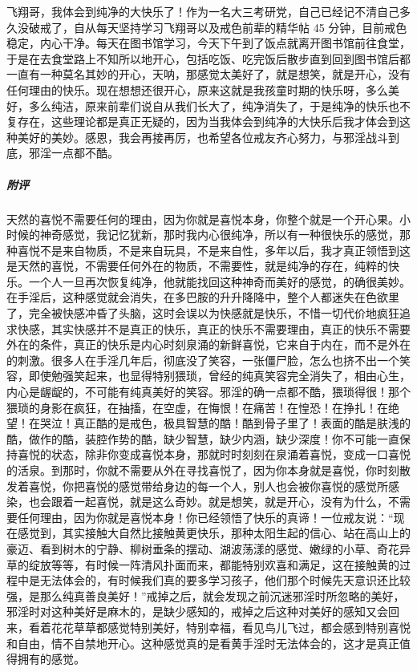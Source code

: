 \begin{case}
    飞翔哥，我体会到纯净的大快乐了！作为一名大三考研党，自己已经记不清自己多久没破戒了，自从每天坚持学习飞翔哥以及戒色前辈的精华帖 45 分钟，目前戒色稳定，内心干净。每天在图书馆学习，今天下午到了饭点就离开图书馆前往食堂，于是在去食堂路上不知所以地开心，包括吃饭、吃完饭后散步直到回到图书馆后都一直有一种莫名其妙的开心，天呐，那感觉太美好了，就是想笑，就是开心，没有任何理由的快乐。现在想想还很开心，原来这就是我孩童时期的快乐呀，多么美好，多么纯洁，原来前辈们说自从我们长大了，纯净消失了，于是纯净的快乐也不复存在，这些理论都是真正无疑的，因为当我体会到纯净的大快乐后我才体会到这种美好的美妙。感恩，我会再接再厉，也希望各位戒友齐心努力，与邪淫战斗到底，邪淫一点都不酷。
    \subparagraph{附评} 天然的喜悦不需要任何的理由，因为你就是喜悦本身，你整个就是一个开心果。小时候的神奇感觉，我记忆犹新，那时我内心很纯净，所以有一种很快乐的感觉，那种喜悦不是来自物质，不是来自玩具，不是来自性，多年以后，我才真正领悟到这是天然的喜悦，不需要任何外在的物质，不需要性，就是纯净的存在，纯粹的快乐。一个人一旦再次恢复纯净，他就能找回这种神奇而美好的感觉，的确很美妙。在手淫后，这种感觉就会消失，在多巴胺的升升降降中，整个人都迷失在色欲里了，完全被快感冲昏了头脑，这时会误以为快感就是快乐，不惜一切代价地疯狂追求快感，其实快感并不是真正的快乐，真正的快乐不需要理由，真正的快乐不需要外在的条件，真正的快乐是内心时刻泉涌的新鲜喜悦，它来自于内在，而不是外在的刺激。很多人在手淫几年后，彻底没了笑容，一张僵尸脸，怎么也挤不出一个笑容，即使勉强笑起来，也显得特别猥琐，曾经的纯真笑容完全消失了，相由心生，内心是龌龊的，不可能有纯真美好的笑容。邪淫的确一点都不酷，猥琐得很！那个猥琐的身影在疯狂，在抽搐，在空虚，在悔恨！在痛苦！在惶恐！在挣扎！在绝望！在哭泣！真正酷的是戒色，极具智慧的酷！酷到骨子里了！表面的酷是肤浅的酷，做作的酷，装腔作势的酷，缺少智慧，缺少内涵，缺少深度！你不可能一直保持喜悦的状态，除非你变成喜悦本身，那就时时刻刻在泉涌着喜悦，变成一口喜悦的活泉。到那时，你就不需要从外在寻找喜悦了，因为你本身就是喜悦，你时刻散发着喜悦，你把喜悦的感觉带给身边的每一个人，别人也会被你喜悦的感觉所感染，也会跟着一起喜悦，就是这么奇妙。就是想笑，就是开心，没有为什么，不需要任何理由，因为你就是喜悦本身！你已经领悟了快乐的真谛！一位戒友说：“现在感觉到，其实接触大自然比接触黄更快乐，那种太阳生起的信心、站在高山上的豪迈、看到树木的宁静、柳树垂条的摆动、湖波荡漾的感觉、嫩绿的小草、奇花异草的绽放等等，有时候一阵清风扑面而来，都能特别欢喜和满足，这在接触黄的过程中是无法体会的，有时候我们真的要多学习孩子，他们那个时候先天意识还比较强，是那么纯真善良美好！”戒掉之后，就会发现之前沉迷邪淫时所忽略的美好，邪淫时对这种美好是麻木的，是缺少感知的，戒掉之后这种对美好的感知又会回来，看着花花草草都感觉特别美好，特别幸福，看见鸟儿飞过，都会感到特别喜悦和自由，情不自禁地开心。这种感觉真的是看黄手淫时无法体会的，这才是真正值得拥有的感觉。
\end{case}

